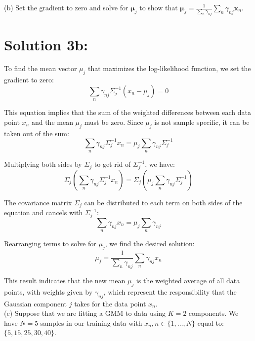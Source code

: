\documentclass[10pt]{article}
\begin{document}
(b) Set the gradient to zero and solve for $\boldsymbol{\mu}_{j}$ to show that $\boldsymbol{\mu}_{j}=\frac{1}{\sum_{n} \gamma_{n j}} \sum_{n} \gamma_{n j} \boldsymbol{x}_{n}$.

\section*{Solution 3b:}

To find the mean vector \( \mu_j \) that maximizes the log-likelihood function, we set the gradient to zero: \\

\[
\sum_n \gamma_{nj} \Sigma_j^{-1} (x_n - \mu_j) = 0
\]

This equation implies that the sum of the weighted differences between each data point \( x_n \) and the mean \( \mu_j \) must be zero. Since \( \mu_j \) is not sample specific, it can be taken out of the sum: \\

\[
\sum_n \gamma_{nj} \Sigma_j^{-1} x_n = \mu_j \sum_n \gamma_{nj} \Sigma_j^{-1}
\]

Multiplying both sides by \( \Sigma_j \) to get rid of \( \Sigma_j^{-1} \), we have: \\

\[
\Sigma_j \left( \sum_n \gamma_{nj} \Sigma_j^{-1} x_n \right) = \Sigma_j \left( \mu_j \sum_n \gamma_{nj} \Sigma_j^{-1} \right)
\]

The covariance matrix \( \Sigma_j \) can be distributed to each term on both sides of the equation and cancels with \( \Sigma_j^{-1} \): \\

\[
\sum_n \gamma_{nj} x_n = \mu_j \sum_n \gamma_{nj}
\]

Rearranging terms to solve for \( \mu_j \), we find the desired solution: \\

\[
\mu_j = \frac{1}{\sum_n \gamma_{nj}} \sum_n \gamma_{nj} x_n
\]

This result indicates that the new mean \( \mu_j \) is the weighted average of all data points, with weights given by \( \gamma_{nj} \), which represent the responsibility that the Gaussian component \( j \) takes for the data point \( x_n \). \\

(c) Suppose that we are fitting a GMM to data using $K=2$ components. We have $N=5$ samples in our training data with $x_{n}, n \in\{1, \ldots, N\}$ equal to: $\{5,15,25,30,40\}$.
\end{document}

